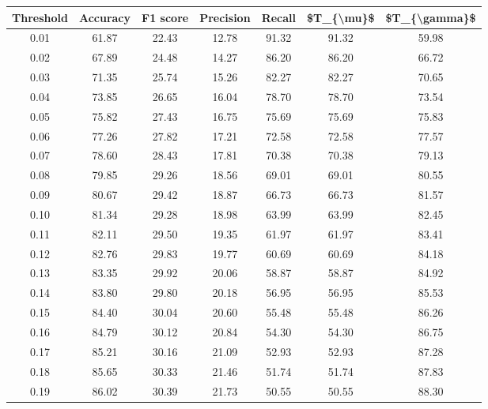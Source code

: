 \begin{tabular}{|c|c|c|c|c|c|c|}
\hline
 Threshold &  Accuracy &  F1 score &  Precision &  Recall &  \$T\_\{\textbackslash mu\}\$ &  \$T\_\{\textbackslash gamma\}\$ \\
\hline
      0.01 &     61.87 &     22.43 &      12.78 &   91.32 &      91.32 &         59.98 \\
      0.02 &     67.89 &     24.48 &      14.27 &   86.20 &      86.20 &         66.72 \\
      0.03 &     71.35 &     25.74 &      15.26 &   82.27 &      82.27 &         70.65 \\
      0.04 &     73.85 &     26.65 &      16.04 &   78.70 &      78.70 &         73.54 \\
      0.05 &     75.82 &     27.43 &      16.75 &   75.69 &      75.69 &         75.83 \\
      0.06 &     77.26 &     27.82 &      17.21 &   72.58 &      72.58 &         77.57 \\
      0.07 &     78.60 &     28.43 &      17.81 &   70.38 &      70.38 &         79.13 \\
      0.08 &     79.85 &     29.26 &      18.56 &   69.01 &      69.01 &         80.55 \\
      0.09 &     80.67 &     29.42 &      18.87 &   66.73 &      66.73 &         81.57 \\
      0.10 &     81.34 &     29.28 &      18.98 &   63.99 &      63.99 &         82.45 \\
      0.11 &     82.11 &     29.50 &      19.35 &   61.97 &      61.97 &         83.41 \\
      0.12 &     82.76 &     29.83 &      19.77 &   60.69 &      60.69 &         84.18 \\
      0.13 &     83.35 &     29.92 &      20.06 &   58.87 &      58.87 &         84.92 \\
      0.14 &     83.80 &     29.80 &      20.18 &   56.95 &      56.95 &         85.53 \\
      0.15 &     84.40 &     30.04 &      20.60 &   55.48 &      55.48 &         86.26 \\
      0.16 &     84.79 &     30.12 &      20.84 &   54.30 &      54.30 &         86.75 \\
      0.17 &     85.21 &     30.16 &      21.09 &   52.93 &      52.93 &         87.28 \\
      0.18 &     85.65 &     30.33 &      21.46 &   51.74 &      51.74 &         87.83 \\
      0.19 &     86.02 &     30.39 &      21.73 &   50.55 &      50.55 &         88.30 \\

\end{tabular}

